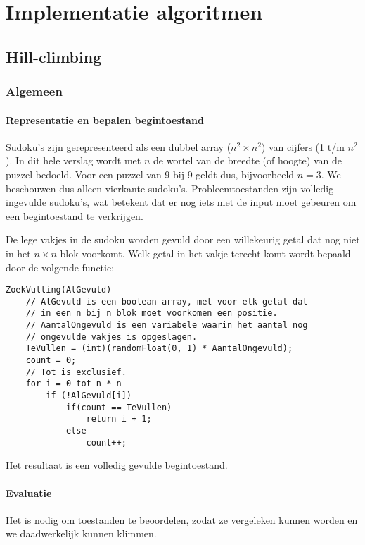 \documentclass[]{report}
\begin{document}
\chapter{Implementatie algoritmen}
\section{Hill-climbing}
\subsection{Algemeen}
\subsubsection{Representatie en bepalen begintoestand}
Sudoku's zijn gerepresenteerd als een dubbel array ($n^2 \times n^2$)  van cijfers (1 t/m $n^2$). In dit hele verslag wordt met $n$ de wortel van de breedte (of hoogte) van de puzzel bedoeld. Voor een puzzel van 9 bij 9 geldt dus, bijvoorbeeld $n = 3$. We beschouwen dus alleen vierkante sudoku's. Probleemtoestanden zijn volledig ingevulde sudoku's, wat betekent dat er nog iets met de input moet gebeuren om een begintoestand te verkrijgen.

De lege vakjes in de sudoku worden gevuld door een willekeurig getal dat nog niet in het $n \times n$ blok voorkomt. Welk getal in het vakje terecht komt wordt bepaald door de volgende functie:

\begin{minipage}{\textwidth}
\begin{lstlisting}
ZoekVulling(AlGevuld)
	// AlGevuld is een boolean array, met voor elk getal dat
	// in een n bij n blok moet voorkomen een positie.
	// AantalOngevuld is een variabele waarin het aantal nog
	// ongevulde vakjes is opgeslagen.
	TeVullen = (int)(randomFloat(0, 1) * AantalOngevuld);
	count = 0;
	// Tot is exclusief.
	for i = 0 tot n * n
		if (!AlGevuld[i])
			if(count == TeVullen)
				return i + 1;
			else 
				count++;
\end{lstlisting}
\end{minipage}

Het resultaat is een volledig gevulde begintoestand.

\subsubsection{Evaluatie}
Het is nodig om toestanden te beoordelen, zodat ze vergeleken kunnen worden en we daadwerkelijk kunnen klimmen.
\end{document}
